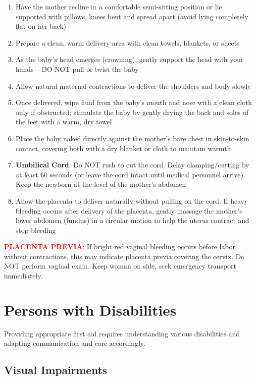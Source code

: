 \begin{enumerate}[leftmargin=*]
  \item Have the mother recline in a comfortable semi-sitting position or lie supported with pillows, knees bent and spread apart (avoid lying completely flat on her back)
  \item Prepare a clean, warm delivery area with clean towels, blankets, or sheets
  \item As the baby's head emerges (crowning), gently support the head with your hands -- DO NOT pull or twist the baby
  \item Allow natural maternal contractions to deliver the shoulders and body slowly
  \item Once delivered, wipe fluid from the baby's mouth and nose with a clean cloth only if obstructed; stimulate the baby by gently drying the back and soles of the feet with a warm, dry towel
  \item Place the baby naked directly against the mother's bare chest in skin-to-skin contact, covering both with a dry blanket or cloth to maintain warmth
  \item \textbf{Umbilical Cord}: Do NOT rush to cut the cord. Delay clamping/cutting by at least 60 seconds (or leave the cord intact until medical personnel arrive). Keep the newborn at the level of the mother's abdomen
  \item Allow the placenta to deliver naturally without pulling on the cord. If heavy bleeding occurs after delivery of the placenta, gently massage the mother's lower abdomen (fundus) in a circular motion to help the uterus contract and stop bleeding
\end{enumerate}

\noindent\textbf{\textcolor{red}{PLACENTA PREVIA}}: If bright red vaginal bleeding occurs before labor without contractions, this may indicate placenta previa covering the cervix. Do NOT perform vaginal exam. Keep woman on side, seek emergency transport immediately.

\section{Persons with Disabilities}

Providing appropriate first aid requires understanding various disabilities and adapting communication and care accordingly.

\subsection{Visual Impairments}

